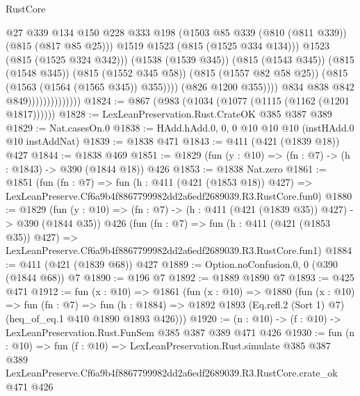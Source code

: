 \begin{lexlean}{RustCore}
\begin{coremodule}
                                              @27
                                              @339
                                              @134
                                              @150
                                              @228
                                              @333
                                              @198
                                              (@1503
                                                @85
                                                @339
                                                (@810 (@811 @339))
                                                (@815 (@817 @85 @25)))
                                              @1519
                                              @1523
                                              (@815 (@1525 @334 @134)))
                                            @1523
                                            (@815 (@1525 @324 @342)))
                                          (@1538 (@1539 @345))
                                          (@815 (@1543 @345))
                                          (@815 (@1548 @345))
                                          (@815 (@1552 @345 @58))
                                          (@815 (@1557 @82 @58 @25))
                                          (@815 (@1563 (@1564 (@1565 @345)) @355))))
                                      (@826 @1200 @355))))
                                @834
                                @838
                                @842
                                @849))))))))))))))
@1824 := @867 (@983 (@1034 (@1077 (@1115 (@1162 (@1201 @1817))))))
@1828 := LexLeanPreservation.Rust.CrateOK @385 @387 @389
@1829 := Nat.casesOn.{0}
@1838 := HAdd.hAdd.{0, 0, 0} @10 @10 @10 (instHAdd.{0} @10 instAddNat)
@1839 := @1838 @471
@1843 := @411 (@421 (@1839 @18)) @427
@1844 := @1838 @469
@1851 := @1829 (fun (y : @10) => (fn : @7) -> (h : @1843) -> @390 (@1844 @18)) @426
@1853 := @1838 Nat.zero
@1861 := @1851
    (fun (fn : @7) =>
    fun (h : @411 (@421 (@1853 @18)) @427) =>
    LexLeanPreserve.Cf6a9b4f8867799982dd2a6edf2689039.R3.RustCore.fun0)
@1880 := @1829
    (fun (y : @10) => (fn : @7) -> (h : @411 (@421 (@1839 @35)) @427) -> @390 (@1844 @35))
    @426
    (fun (fn : @7) =>
    fun (h : @411 (@421 (@1853 @35)) @427) =>
    LexLeanPreserve.Cf6a9b4f8867799982dd2a6edf2689039.R3.RustCore.fun1)
@1884 := @411 (@421 (@1839 @68)) @427
@1889 := Option.noConfusion.{0, 0} (@390 (@1844 @68)) @7
@1890 := @196 @7
@1892 := @1889 @1890 @7
@1893 := @425 @471
@1912 := fun (x : @10) =>
  @1861
    (fun (x : @10) =>
    @1880
      (fun (x : @10) =>
      fun (fn : @7) =>
      fun (h : @1884) =>
      @1892 @1893 (Eq.refl.{2} (Sort 1) @7) (heq_of_eq.{1} @410 @1890 @1893 @426)))
@1920 := (n : @10) -> (f : @10) -> LexLeanPreservation.Rust.FunSem @385 @387 @389 @471 @426
@1930 := fun (n : @10) =>
  fun (f : @10) =>
  LexLeanPreservation.Rust.simulate
    @385
    @387
    @389
    LexLeanPreserve.Cf6a9b4f8867799982dd2a6edf2689039.R3.RustCore.crate_ok
    @471
    @426
\end{coremodule}
\end{lexlean}
